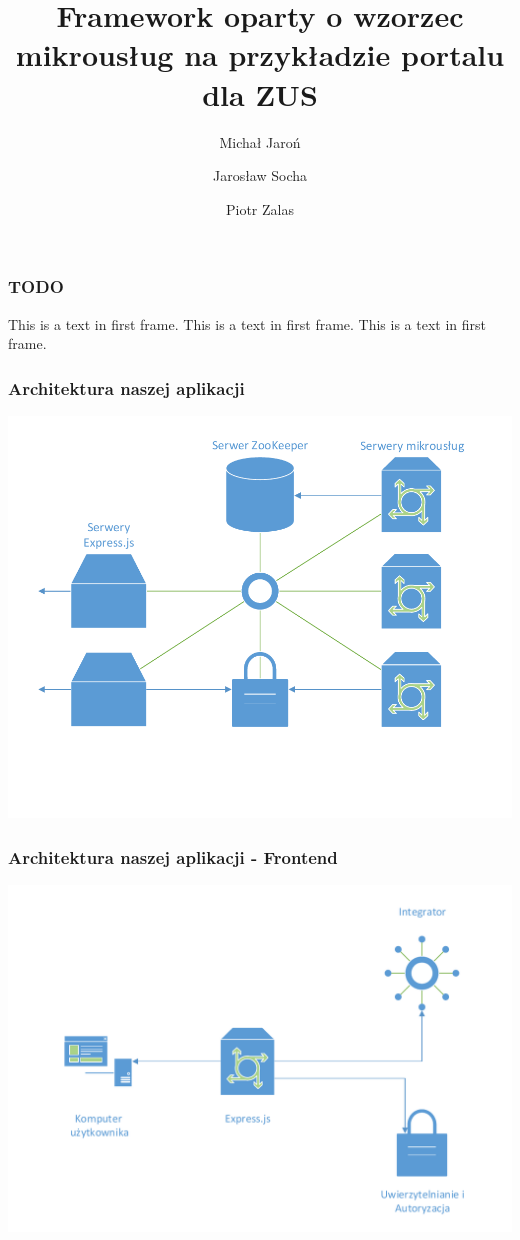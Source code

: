 \documentclass{beamer}
\title[ZPP] %
{Framework oparty o wzorzec mikrousług na przykładzie portalu dla ZUS}
\subtitle{}
\author[Jaroń, Socha, Zalas] %
{Michał Jaroń \and Jarosław Socha \and Piotr Zalas}
\institute[MIMUW] %
{
}
\date[9 czerwca 2017] %
{}
\begin{document}
\frame{\titlepage}
 
\begin{frame}
\frametitle{TODO}
This is a text in first frame. This is a text in first frame. This is a text in first frame.
\end{frame}

\begin{frame}
\frametitle{Architektura naszej aplikacji}
\includegraphics[width=\textwidth]{calosc.pdf}
\end{frame}

\begin{frame}
\frametitle{Architektura naszej aplikacji - Frontend}
\includegraphics[width=\textwidth]{Frontend.pdf}
\end{frame}
\end{document}
